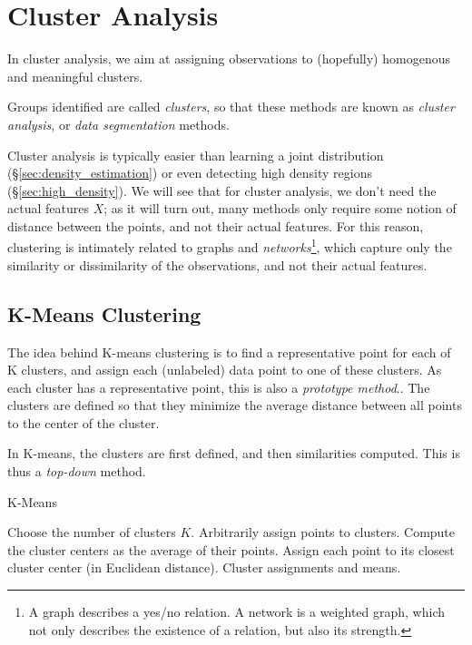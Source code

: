 \section{Cluster Analysis}
\label{sec:cluster_analysis}

In cluster analysis, we aim at assigning observations to (hopefully) homogenous and meaningful clusters. 

Groups identified are called \emph{clusters}, so that these methods are known as \emph{cluster analysis}, or \emph{data segmentation} methods.

Cluster analysis is typically easier than learning a joint distribution (\S\ref{sec:density_estimation}) or even detecting high density regions (\S\ref{sec:high_density}). 
We will see that for cluster analysis, we don't need the actual features $X$; as it will turn out, many methods only require some notion of distance between the points, and not their actual features. 
For this reason, clustering is intimately related to graphs and \emph{networks}\footnote{A graph describes a yes/no relation. A network is a weighted graph, which not only describes the existence of a relation, but also its strength.}, which capture only the similarity or dissimilarity of the observations, and not their actual features.



\subsection{K-Means Clustering}
\label{sec:kmeans}
The idea behind K-means clustering is to find a representative point for each of K clusters, and assign each (unlabeled) data point to one of these clusters. As each cluster has a representative point, this is also a \emph{prototype method}..
The clusters are defined so that they minimize the average distance between all points to the center of the cluster.

In K-means, the clusters are first defined, and then similarities computed. This is thus a \emph{top-down} method.

\begin{algorithm}[H]
\caption{K-Means}
\begin{algorithmic}
\State Choose the number of clusters $K$.
\State Arbitrarily assign points to clusters.
	\State Compute the cluster centers as the average of their points.
	\State Assign each point to its closest cluster center (in Euclidean distance).
\EndWhile
\State \Return Cluster assignments and means.
\end{algorithmic}
\end{algorithm}





